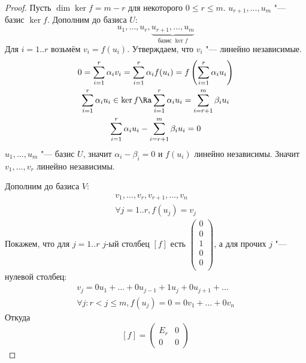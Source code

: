 \begin{proof}
	Пусть $\dim \ker f = m - r$ для некоторого $0 \le r \le m$.
	$u_{r+1}, \dots, u_m$ "--- базис $\ker f$.
	Дополним до базиса $U$:
	\[ u_1, \dots, u_r, \underbrace{u_{r+1}, \dots, u_m}_{\text{базис $\ker f$}} \]
	Для $i = 1..r$ возьмём $v_i = f(u_i)$.
	Утверждаем, что $v_i$ "--- линейно независимые.
	\begin{gather*}
		0 = \sum_{i=1}^r \alpha_iv_i = \sum_{i=1}^r \alpha_if(u_i)= f\left(\sum_{i=1}^r \alpha_iu_i\right) \\
		\sum_{i=1}^r \alpha_iu_i \in \ker f \Ra \sum_{i=1}^r \alpha_iu_i = \sum_{i=r+1}^m \beta_i u_i \\
		\sum_{i=1}^r \alpha_iu_i - \sum_{i=r+1}^m \beta_iu_i = 0
	\end{gather*}
	$u_1, \dots, u_m$ "--- базис $U$, значит $\alpha_i - \beta_i = 0$ и $f(u_i)$ линейно независимы.
	Значит $v_1, \dots, v_r$ линейно независимы.

	Дополним до базиса $V$:
	\begin{gather*}
		v_1, \dots, v_r, v_{r+1}, \dots, v_n \\
		\forall j=1..r, f(u_j) = v_j
	\end{gather*}
	Покажем, что для $j=1..r$ $j$-ый столбец $[f]$ есть $\begin{pmatrix} 0 \\0 \\1 \\0 \\0 \\ \end{pmatrix}$,
	а для прочих $j$ "--- нулевой столбец:
	\begin{gather*}
		v_j = 0u_1 + \dots + 0u_{j-1} + 1u_j + 0u_{j+1} + \dots \\
		\forall j\colon r < j \le m, f(u_j) = 0 = 0 v_1 + \dots + 0v_n
	\end{gather*}
	Откуда
	\[
		[f] = \begin{pmatrix}
			E_r & 0 \\
			0   & 0
		\end{pmatrix}
	\]
\end{proof}

